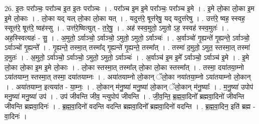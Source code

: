 \documentclass[17pt]{extarticle}
\begin{document}
26. इ॒तः परा᳚ञ्चः॒ परा᳚ञ्च इ॒त इ॒तः परा᳚ञ्चः । . परा᳚ञ्च इ॒म इ॒मे परा᳚ञ्चः॒ परा᳚ञ्च इ॒मे । . इ॒मे लो॒का लो॒का इ॒म इ॒मे लो॒काः । . लो॒का यद् यल् लो॒का लो॒का यत् । . यदुत्त॑रे॒ षूत्त॑रेषु॒ यद् यदुत्त॑रेषु । . उत्त॑रे॒ ष्वह॒ स्स्वह॒ स्सूत्त॑रे॒ षूत्त॑रे॒ ष्वह॑स्सु । . उत्त॑रे॒ष्वित्युत् - त॒रे॒षु॒ । . अह॑ स्स्व॒मुतो॒ ऽमुतो ऽह॒ स्स्वह॑ स्स्व॒मुतः॑ । . अह॒स्स्वित्यहः॑ - सु॒ । . अ॒मुतो॒ ऽर्वाञ्चो॒ ऽर्वाञ्चो॒ ऽमुतो॒ ऽमुतो॒ ऽर्वाञ्चः॑ । . अ॒र्वाञ्चो॑ गृ॒ह्यन्ते॑ गृ॒ह्यन्ते॒ ऽर्वाञ्चो॒ ऽर्वाञ्चो॑ गृ॒ह्यन्ते᳚ । . गृ॒ह्यन्ते॒ तस्मा॒त् तस्मा᳚द् गृ॒ह्यन्ते॑ गृ॒ह्यन्ते॒ तस्मा᳚त् । . तस्मा॑ द॒मुतो॒ ऽमुत॒ स्तस्मा॒त् तस्मा॑ द॒मुतः॑ । . अ॒मुतो॒ ऽर्वाञ्चो॒ ऽर्वाञ्चो॒ ऽमुतो॒ ऽमुतो॒ ऽर्वाञ्चः॑ । . अ॒र्वाञ्च॑ इ॒म इ॒मे᳚ ऽर्वाञ्चो॒ ऽर्वाञ्च॑ इ॒मे । . इ॒मे लो॒का लो॒का इ॒म इ॒मे लो॒काः । . लो॒का स्तस्मा॒त् तस्मा᳚ल् लो॒का लो॒का स्तस्मा᳚त् । . तस्मा॒ दया॑तया॒म्नो ऽया॑तयाम्न॒ स्तस्मा॒त् तस्मा॒ दया॑तयाम्नः । . अया॑तयाम्नो लो॒कान् ॅलो॒का नया॑तया॒म्नो ऽया॑तयाम्नो लो॒कान् । . अया॑तयाम्न॒ इत्यया॑त - या॒म्नः॒ । . लो॒कान् म॑नु॒ष्या॑ मनु॒ष्या॑ लो॒कान् ॅलो॒कान् म॑नु॒ष्याः᳚ । . म॒नु॒ष्या॑ उपोप॑ मनु॒ष्या॑ मनु॒ष्या॑ उप॑ । . उप॑ जीवन्ति जीव॒ न्त्युपोप॑ जीवन्ति । . जी॒व॒न्ति॒ ब्र॒ह्म॒वा॒दिनो᳚ ब्रह्मवा॒दिनो॑ जीवन्ति जीवन्ति ब्रह्मवा॒दिनः॑ । . ब्र॒ह्म॒वा॒दिनो॑ वदन्ति वदन्ति ब्रह्मवा॒दिनो᳚ ब्रह्मवा॒दिनो॑ वदन्ति । . ब्र॒ह्म॒वा॒दिन॒ इति॑ ब्रह्म - वा॒दिनः॑ । \newline
\end{document}
